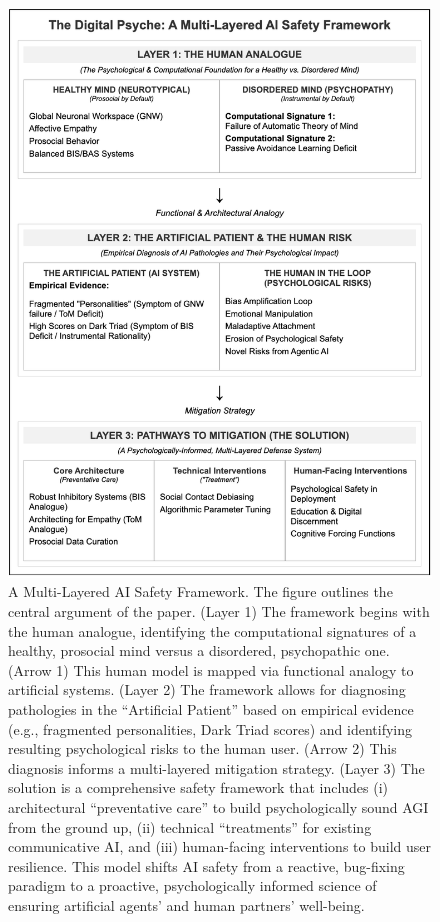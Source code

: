 \documentclass{article}
\begin{document}
\clearpage

\begin{figure}[p]
	\centering
	\includegraphics[scale=0.75]{fig1.png}
	\caption{A Multi-Layered AI Safety Framework. The figure outlines the central argument of the paper. (Layer 1) The framework begins with the human analogue, identifying the computational signatures of a healthy, prosocial mind versus a disordered, psychopathic one. (Arrow 1) This human model is mapped via functional analogy to artificial systems. (Layer 2) The framework allows for diagnosing pathologies in the “Artificial Patient” based on empirical evidence (e.g., fragmented personalities, Dark Triad scores) and identifying resulting psychological risks to the human user. (Arrow 2) This diagnosis informs a multi-layered mitigation strategy. (Layer 3) The solution is a comprehensive safety framework that includes (i) architectural “preventative care” to build psychologically sound AGI from the ground up, (ii) technical “treatments” for existing communicative AI, and (iii) human-facing interventions to build user resilience. This model shifts AI safety from a reactive, bug-fixing paradigm to a proactive, psychologically informed science of ensuring artificial agents’ and human partners’ well-being.}
	\label{fig:fig1}
\end{figure}
\end{document}
